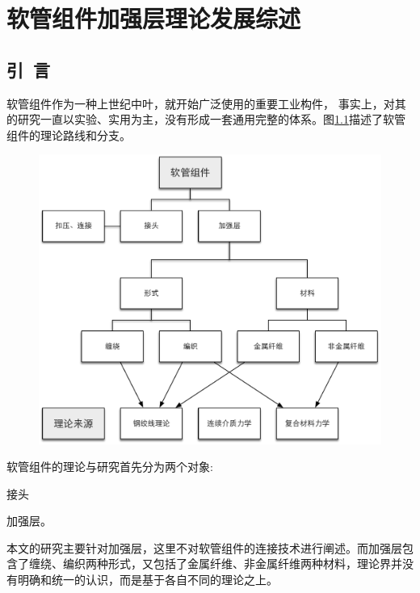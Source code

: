 
\chapter{软管组件加强层理论发展综述}


\section{引~言}



软管组件作为一种上世纪中叶，就开始广泛使用的重要工业构件，
事实上，对其的研究一直以实验、实用为主，没有形成一套通用完整的体系。图\ref{fig:hose-system-theories}描述了软管组件的理论路线和分支。

\begin{figure}[!htbp]
\centering
\includegraphics[width=0.7\linewidth]{figure/chap3/理论体系}
	\label{fig:hose-system-theories}
\end{figure}

软管组件的理论与研究首先分为两个对象:
\begin{inparaenum}[1).]
	\item 接头
	\item 加强层。
\end{inparaenum}
本文的研究主要针对加强层，这里不对软管组件的连接技术进行阐述。而加强层包含了缠绕、编织两种形式，又包括了金属纤维、非金属纤维两种材料，理论界并没有明确和统一的认识，而是基于各自不同的理论之上。

